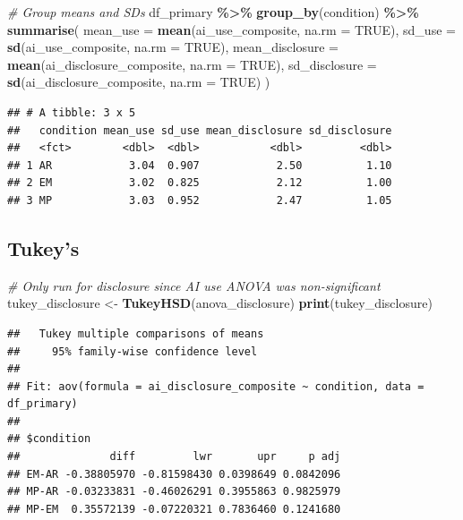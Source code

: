 \documentclass[
]{article}
\newenvironment{Shaded}{\begin{snugshade}}{\end{snugshade}}
\newcommand{\AttributeTok}[1]{\textcolor[rgb]{0.13,0.29,0.53}{#1}}
\newcommand{\CommentTok}[1]{\textcolor[rgb]{0.56,0.35,0.01}{\textit{#1}}}
\newcommand{\ConstantTok}[1]{\textcolor[rgb]{0.56,0.35,0.01}{#1}}
\newcommand{\FunctionTok}[1]{\textcolor[rgb]{0.13,0.29,0.53}{\textbf{#1}}}
\newcommand{\NormalTok}[1]{#1}
\newcommand{\OtherTok}[1]{\textcolor[rgb]{0.56,0.35,0.01}{#1}}
\newcommand{\SpecialCharTok}[1]{\textcolor[rgb]{0.81,0.36,0.00}{\textbf{#1}}}
\begin{document}
\begin{Shaded}
\begin{Highlighting}[]
\CommentTok{\# Group means and SDs}
\NormalTok{df\_primary }\SpecialCharTok{\%\textgreater{}\%}
  \FunctionTok{group\_by}\NormalTok{(condition) }\SpecialCharTok{\%\textgreater{}\%}
  \FunctionTok{summarise}\NormalTok{(}
    \AttributeTok{mean\_use        =} \FunctionTok{mean}\NormalTok{(ai\_use\_composite, }\AttributeTok{na.rm =} \ConstantTok{TRUE}\NormalTok{),}
    \AttributeTok{sd\_use          =} \FunctionTok{sd}\NormalTok{(ai\_use\_composite, }\AttributeTok{na.rm =} \ConstantTok{TRUE}\NormalTok{),}
    \AttributeTok{mean\_disclosure =} \FunctionTok{mean}\NormalTok{(ai\_disclosure\_composite, }\AttributeTok{na.rm =} \ConstantTok{TRUE}\NormalTok{),}
    \AttributeTok{sd\_disclosure   =} \FunctionTok{sd}\NormalTok{(ai\_disclosure\_composite, }\AttributeTok{na.rm =} \ConstantTok{TRUE}\NormalTok{)}
\NormalTok{  )}
\end{Highlighting}
\end{Shaded}

\begin{verbatim}
## # A tibble: 3 x 5
##   condition mean_use sd_use mean_disclosure sd_disclosure
##   <fct>        <dbl>  <dbl>           <dbl>         <dbl>
## 1 AR            3.04  0.907            2.50          1.10
## 2 EM            3.02  0.825            2.12          1.00
## 3 MP            3.03  0.952            2.47          1.05
\end{verbatim}

\subsection{Tukey's}\label{tukeys}

\begin{Shaded}
\begin{Highlighting}[]
\CommentTok{\# Only run for disclosure since AI use ANOVA was non{-}significant}
\NormalTok{tukey\_disclosure }\OtherTok{\textless{}{-}} \FunctionTok{TukeyHSD}\NormalTok{(anova\_disclosure)}
\FunctionTok{print}\NormalTok{(tukey\_disclosure)}
\end{Highlighting}
\end{Shaded}

\begin{verbatim}
##   Tukey multiple comparisons of means
##     95% family-wise confidence level
## 
## Fit: aov(formula = ai_disclosure_composite ~ condition, data = df_primary)
## 
## $condition
##              diff         lwr       upr     p adj
## EM-AR -0.38805970 -0.81598430 0.0398649 0.0842096
## MP-AR -0.03233831 -0.46026291 0.3955863 0.9825979
## MP-EM  0.35572139 -0.07220321 0.7836460 0.1241680
\end{verbatim}
\end{document}

